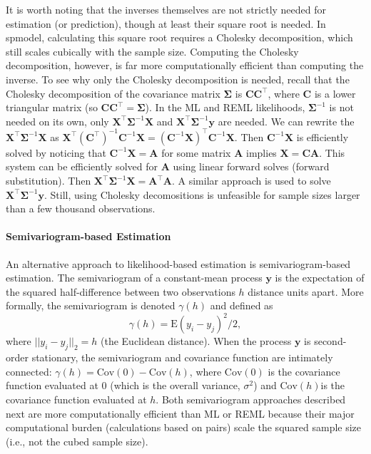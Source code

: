 \documentclass{article}
\begin{document}
It is worth noting that the inverses themselves are not strictly needed
for estimation (or prediction), though at least their square root is
needed. In spmodel, calculating this square root requires a Cholesky
decomposition, which still scales cubically with the sample size.
Computing the Cholesky decomposition, however, is far more
computationally efficient than computing the inverse. To see why only
the Cholesky decomposition is needed, recall that the Cholesky
decomposition of the covariance matrix \(\mathbf{\Sigma}\) is
\(\mathbf{C}\mathbf{C}^\intercal\), where \(\mathbf{C}\) is a lower
triangular matrix (so
\(\mathbf{C}\mathbf{C}^\intercal = \mathbf{\Sigma}\)). In the ML and
REML likelihoods, \(\mathbf{\Sigma}^{-1}\) is not needed on its own,
only \(\mathbf{X}^\intercal \mathbf{\Sigma}^{-1} \mathbf{X}\) and
\(\mathbf{X}^\intercal \mathbf{\Sigma}^{-1} \mathbf{y}\) are needed. We
can rewrite the \(\mathbf{X}^\intercal \mathbf{\Sigma}^{-1} \mathbf{X}\)
as
\(\mathbf{X}^\intercal (\mathbf{C}^\intercal)^{-1} \mathbf{C}^{-1} \mathbf{X} = (\mathbf{C}^{-1} \mathbf{X})^\intercal \mathbf{C}^{-1} \mathbf{X}\).
Then \(\mathbf{C}^{-1} \mathbf{X}\) is efficiently solved by noticing
that \(\mathbf{C}^{-1} \mathbf{X} = \mathbf{A}\) for some matrix
\(\mathbf{A}\) implies \(\mathbf{X} = \mathbf{C} \mathbf{A}\). This
system can be efficiently solved for \(\mathbf{A}\) using linear forward
solves (forward substitution). Then
\(\mathbf{X}^\intercal \mathbf{\Sigma}^{-1} \mathbf{X} = \mathbf{A}^\intercal \mathbf{A}\).
A similar approach is used to solve
\(\mathbf{X}^\intercal \mathbf{\Sigma}^{-1} \mathbf{y}\). Still, using
Cholesky decomositions is unfeasible for sample sizes larger than a few
thousand observations.

\hypertarget{semivariogram-based-estimation}{%
\paragraph{Semivariogram-based
Estimation}\label{semivariogram-based-estimation}}

An alternative approach to likelihood-based estimation is
semivariogram-based estimation. The semivariogram of a constant-mean
process \(\mathbf{y}\) is the expectation of the squared half-difference
between two observations \(h\) distance units apart. More formally, the
semivariogram is denoted \(\gamma(h)\) and defined as
\begin{equation}\label{eq:sv}
  \gamma(h) = \text{E}(y_i - y_j)^2 / 2 ,
\end{equation} where \(||y_i - y_j||_2 = h\) (the Euclidean distance).
When the process \(\mathbf{y}\) is second-order stationary, the
semivariogram and covariance function are intimately connected:
\(\gamma(h) = \text{Cov}(0) - \text{Cov}(h)\), where \(\text{Cov}(0)\)
is the covariance function evaluated at 0 (which is the overall
variance, \(\sigma^2\)) and \(\text{Cov}(h)\)is the covariance function
evaluated at \(h\). Both semivariogram approaches described next are
more computationally efficient than ML or REML because their major
computational burden (calculations based on pairs) scale the squared
sample size (i.e., not the cubed sample size).
\end{document}
